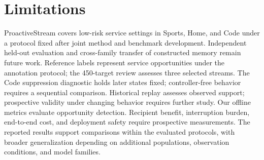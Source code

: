 \section*{Limitations}
\label{sec:limitations}

ProactiveStream covers low-risk service settings in Sports, Home, and Code under a protocol fixed after joint method and benchmark development.
Independent held-out evaluation and cross-family transfer of constructed memory remain future work.
Reference labels represent service opportunities under the annotation protocol; the 450-target review assesses three selected streams.
The Code suppression diagnostic holds later states fixed; controller-free behavior requires a sequential comparison.
Historical replay assesses observed support; prospective validity under changing behavior requires further study.
Our offline metrics evaluate opportunity detection.
Recipient benefit, interruption burden, end-to-end cost, and deployment safety require prospective measurements.
The reported results support comparisons within the evaluated protocols, with broader generalization depending on additional populations, observation conditions, and model families.
